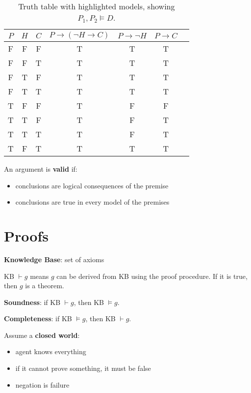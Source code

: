 \documentclass[11pt]{article}
\begin{document}
\begin{table}[h]
    \centering
    \begin{tabular}{ccccccc}
        \toprule
        \( P \) & \( H \) & \( C \) & \( P \to(\neg H \to C) \) & \( P \to \neg H \) & \( P \to C \) \\
        \midrule
        \rowcolor{green!30!black!70}
        F & F & F & T & T & T \\
        \rowcolor{green!30!black!70}
        F & F & T & T & T & T \\
        \rowcolor{green!30!black!70}
        F & T & F & T & T & T \\
        \rowcolor{green!30!black!70}
        F & T & T & T & T & T \\
        T & F & F & T & F & F \\
        T & T & F & T & F & T \\
        T & T & T & T & F & T \\
        \rowcolor{green!30!black!70}
        T & F & T & T & T & T \\
        \bottomrule
    \end{tabular}
    \caption{Truth table with highlighted models, showing $P_{1}, P_{2} \models D$.}
\end{table}

An argument is \textbf{valid} if:
\begin{itemize}
\item conclusions are logical consequences of the premise
\item conclusions are true in every model of the premises
\end{itemize}
\section{Proofs}
\label{sec:orgeed1bc8}
\textbf{Knowledge Base}: set of axioms

KB \(\vdash g\) means \(g\) can be derived from KB using the proof procedure.
If it is true, then \(g\) is a theorem.

\textbf{Soundness}: if KB \(\vdash g\), then KB \(\models g\).

\textbf{Completeness}: if KB \(\models g\), then KB \(\vdash g\).

Assume a \textbf{closed world}:
\begin{itemize}
\item agent knows everything
\item if it cannot prove something, it must be false
\item negation is failure
\end{itemize}
\end{document}
